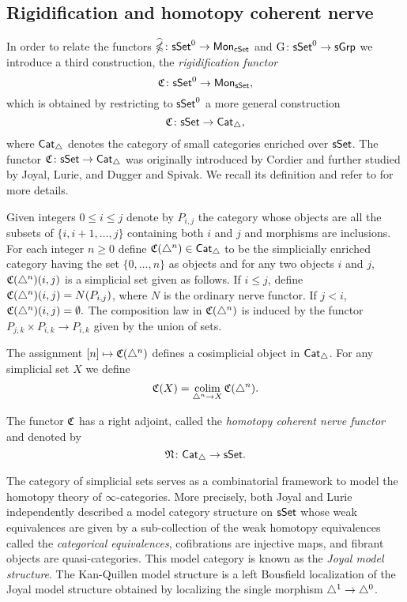 \subsection{Rigidification and homotopy coherent nerve}

In order to relate the functors $\widehat{\operatorname{\mathbb{\Omega}}} \colon \mathsf{sSet}^0 \to \mathsf{Mon}_{\mathsf{cSet}}$ and $\operatorname{G} \colon \mathsf{sSet}^0\to \mathsf{sGrp}$ we introduce a third construction, the \textit{rigidification functor}
$$\operatorname{\mathfrak{C}} \colon \mathsf{sSet}^0 \to \mathsf{Mon}_{\mathsf{sSet}},$$
which is obtained by restricting to $\mathsf{sSet}^0$ a more general construction
$$\operatorname{\mathfrak{C}} \colon \mathsf{sSet} \to \mathsf{Cat}_{\triangle},$$
where $\mathsf{Cat}_{\triangle}$ denotes the category of small categories enriched over $\mathsf{sSet}$. The functor $\operatorname{\mathfrak{C}} \colon \mathsf{sSet} \to \mathsf{Cat}_{\triangle}$ was originally introduced by Cordier and further studied by Joyal, Lurie, and Dugger and Spivak. We recall its definition and refer to \cite{dugger2011rigidification} for more details. 

Given integers $0 \leq  i \leq j$ denote by $P_{i,j}$ the category whose objects are all the subsets of $\{i, i+1, \dots, j\}$ containing both $i$ and $j$ and morphisms are inclusions.
For each integer $n \geq 0$ define $\operatorname{\mathfrak{C}}(\triangle^n) \in \mathsf{Cat}_{\triangle}$ to be the simplicially enriched category having the set $\{0, \dots, n\}$ as objects and for any two objects $i$ and $j$, $\operatorname{\mathfrak{C}}(\triangle^n)(i,j)$ is a simplicial set given as follows. If $i \leq j$, define $\operatorname{\mathfrak{C}}(\triangle^n)(i,j)= N(P_{i,j})$, where $N$ is the ordinary nerve functor.
If $j < i$, $\operatorname{\mathfrak{C}}(\triangle^n)(i,j) = \emptyset.$ The composition law in $\operatorname{\mathfrak{C}}(\triangle^n)$ is induced by the functor $P_{j,k} \times P_{i,k} \to P_{i,k}$ given by the union of sets.

The assignment $[n] \mapsto \operatorname{\mathfrak{C}}(\triangle^n)$ defines a cosimplicial object in $\mathsf{Cat}_{\triangle}$.
For any simplicial set $X$ we define
\begin{equation*}
\operatorname{\mathfrak{C}}(X) = \operatorname*{colim}_{\triangle^n \to X} \operatorname{\mathfrak{C}}(\triangle^n).
\end{equation*}

The functor $\operatorname{\mathfrak{C}}$ has a right adjoint, called the \textit{homotopy coherent nerve functor} and denoted by
$$\operatorname{\mathfrak{N}} \colon \mathsf{Cat}_{\triangle} \to \mathsf{sSet}.$$


The category of simplicial sets serves as a combinatorial framework to model the homotopy theory of $\infty$-categories.
More precisely, both Joyal and Lurie independently described a model category structure on $\mathsf{sSet}$ whose weak equivalences are given by a sub-collection of the weak homotopy equivalences called the \textit{categorical equivalences}, cofibrations are injective maps, and fibrant objects are quasi-categories.
This model category is known as the \textit{Joyal model structure}.
The Kan-Quillen model structure is a left Bousfield localization of the Joyal model structure obtained by localizing the single morphism $\triangle^1 \to \triangle^0$.

